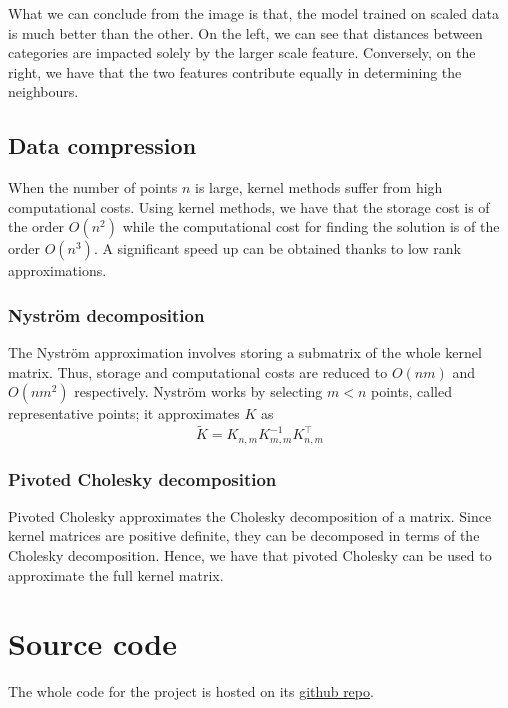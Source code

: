 What we can conclude from the image is that, the model trained on scaled data is much better than the other.
On the left, we can see that distances between categories are impacted solely by the larger scale feature. Conversely, on the right, we have that the two features contribute equally in determining the neighbours.

\subsection{Data compression}
When the number of points $n$ is large, kernel methods suffer from high computational costs. 
Using kernel methods, we have that the storage cost is of the order $O(n^2)$ while the computational cost for finding the solution is of the order $O(n^3)$.
A significant speed up can be obtained thanks to low rank approximations.


\subsubsection{Nyström decomposition}
The Nyström approximation involves storing a submatrix of the whole kernel matrix. Thus, storage and computational costs are reduced to $O(nm)$ and $O(nm^2)$ respectively.
Nyström works by selecting $m<n$ points, called representative points; it approximates $K$ as
\begin{equation}
    \tilde {K}=K_{n,m} K_{m,m}^{-1}K_{n,m}^\intercal
\end{equation}


\subsubsection{Pivoted Cholesky decomposition}
Pivoted Cholesky approximates the Cholesky decomposition of a matrix. Since kernel matrices are positive definite, they can be decomposed in terms of the Cholesky decomposition. Hence, we have that pivoted Cholesky can be used to approximate the full kernel matrix.


\newpage
\section{Source code}\label{src_code}
The whole code for the project is hosted on its
\href{https://github.com/luca-pernigo/ThesisKernelMethods}{github repo}.

